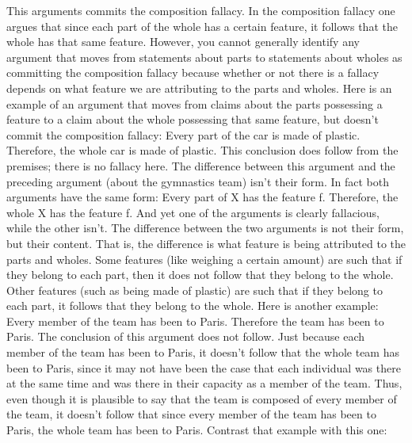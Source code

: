 This arguments commits the composition fallacy. In the composition fallacy one
argues that since each part of the whole has a certain feature, it follows that the
whole has that same feature. However, you cannot generally identify any
argument that moves from statements about parts to statements about wholes
as committing the composition fallacy because whether or not there is a fallacy
depends on what feature we are attributing to the parts and wholes. Here is an
example of an argument that moves from claims about the parts possessing a
feature to a claim about the whole possessing that same feature, but doesn't
commit the composition fallacy:
Every part of the car is made of plastic. Therefore, the whole car is made
of plastic.
This conclusion does follow from the premises; there is no fallacy here. The
difference between this argument and the preceding argument (about the
gymnastics team) isn't their form. In fact both arguments have the same form:
Every part of X has the feature f. Therefore, the whole X has the feature f.
And yet one of the arguments is clearly fallacious, while the other isn't. The
difference between the two arguments is not their form, but their content. That
is, the difference is what feature is being attributed to the parts and wholes.
Some features (like weighing a certain amount) are such that if they belong to
each part, then it does not follow that they belong to the whole. Other features
(such as being made of plastic) are such that if they belong to each part, it
follows that they belong to the whole.
Here is another example:
Every member of the team has been to Paris. Therefore the team has
been to Paris.
The conclusion of this argument does not follow. Just because each member of
the team has been to Paris, it doesn't follow that the whole team has been to
Paris, since it may not have been the case that each individual was there at the
same time and was there in their capacity as a member of the team. Thus, even
though it is plausible to say that the team is composed of every member of the
team, it doesn't follow that since every member of the team has been to Paris,
the whole team has been to Paris. Contrast that example with this one:

